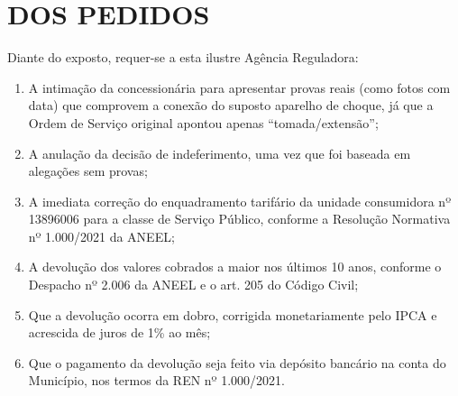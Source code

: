 \section{DOS PEDIDOS}

Diante do exposto, requer-se a esta ilustre Agência Reguladora:

\begin{enumerate}[resume]
    \item A intimação da concessionária para apresentar provas reais (como fotos com data) que comprovem a conexão do suposto aparelho de choque, já que a Ordem de Serviço original apontou apenas ``tomada/extensão'';
    
    \item A anulação da decisão de indeferimento, uma vez que foi baseada em alegações sem provas;
    
    \item A imediata correção do enquadramento tarifário da unidade consumidora nº 13896006 para a classe de Serviço Público, conforme a Resolução Normativa nº 1.000/2021 da ANEEL;
    
    \item A devolução dos valores cobrados a maior nos últimos 10 anos, conforme o Despacho nº 2.006 da ANEEL e o art. 205 do Código Civil;
    
    \item Que a devolução ocorra em dobro, corrigida monetariamente pelo IPCA e acrescida de juros de 1\% ao mês;
    
    \item Que o pagamento da devolução seja feito via depósito bancário na conta do Município, nos termos da REN nº 1.000/2021.
\end{enumerate}

